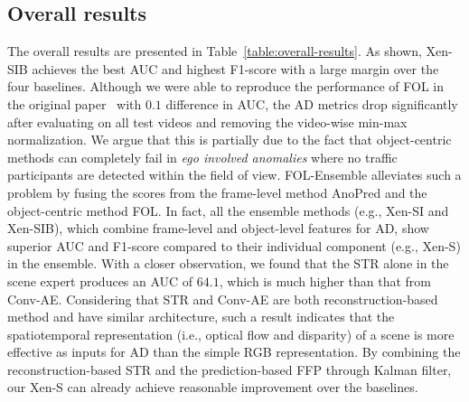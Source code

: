 \subsection{Overall results}
The overall results are presented in Table~\ref{table:overall-results}. As shown, Xen-SIB achieves the best AUC and highest F1-score with a large margin over the four baselines. Although we were able to reproduce the performance of FOL in the original paper~\citep{yao2022dota} with $0.1$ difference in AUC, the AD metrics drop significantly after evaluating on all test videos and removing the video-wise min-max normalization. We argue that this is partially due to the fact that object-centric methods can completely fail in \textit{ego involved anomalies} where no traffic participants are detected within the field of view. FOL-Ensemble alleviates such a problem by fusing the scores from the frame-level method AnoPred and the object-centric method FOL. In fact, all the ensemble methods (e.g., Xen-SI and Xen-SIB), which combine frame-level and object-level features for AD, show superior AUC and F1-score compared to their individual component (e.g., Xen-S) in the ensemble. With a closer observation, we found that the STR alone in the scene expert produces an AUC of $64.1$, which is much higher than that from Conv-AE. Considering that STR and Conv-AE are both reconstruction-based method and have similar architecture, such a result indicates that the spatiotemporal representation (i.e., optical flow and disparity) of a scene is more effective as inputs for AD than the simple RGB representation. By combining the reconstruction-based STR and the prediction-based FFP through Kalman filter, our Xen-S can already achieve reasonable improvement over the baselines.

